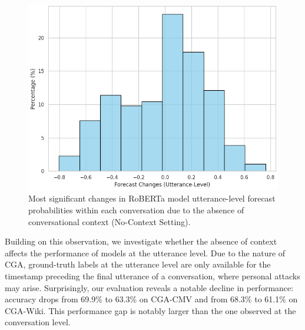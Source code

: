 \begin{figure}[t]
    \centering
    \includegraphics[width=\linewidth]{figures/utt_level_changes.png}
    \caption{Most significant changes in RoBERTa model utterance-level forecast probabilities within each conversation due to the absence of conversational context (No-Context Setting).}
    \label{fig:utt_level_changes}
\end{figure}

Building on this observation, we investigate whether the absence of context affects the performance of models at the utterance level. 
%
Due to the nature of CGA, ground-truth labels at the utterance level are only available for the timestamp preceding the final utterance of a conversation, where personal attacks may arise. 
%
Surprisingly, our evaluation reveals a notable decline in performance: accuracy drops from 69.9\% to 63.3\% on CGA-CMV and from 68.3\% to 61.1\% on CGA-Wiki. 
%
This performance gap is notably larger than the one observed at the conversation level.


